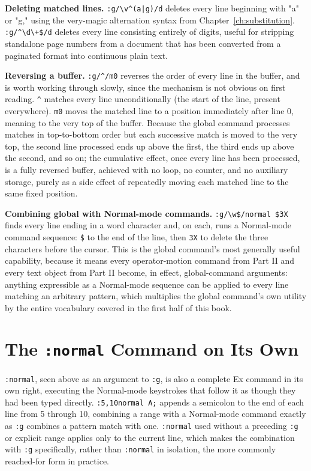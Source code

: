 \textbf{Deleting matched lines.} \texttt{:g/\textbackslash v\textasciicircum(a|g)/d} deletes every line beginning with "a" or "g," using the very-magic alternation syntax from Chapter~\ref{ch:substitution}. \texttt{:g/\textasciicircum\textbackslash d\textbackslash+\$/d} deletes every line consisting entirely of digits, useful for stripping standalone page numbers from a document that has been converted from a paginated format into continuous plain text.

\textbf{Reversing a buffer.} \texttt{:g/\textasciicircum/m0} reverses the order of every line in the buffer, and is worth working through slowly, since the mechanism is not obvious on first reading. \texttt{\textasciicircum} matches every line unconditionally (the start of the line, present everywhere). \texttt{m0} moves the matched line to a position immediately after line 0, meaning to the very top of the buffer. Because the global command processes matches in top-to-bottom order but each successive match is moved to the very top, the second line processed ends up above the first, the third ends up above the second, and so on; the cumulative effect, once every line has been processed, is a fully reversed buffer, achieved with no loop, no counter, and no auxiliary storage, purely as a side effect of repeatedly moving each matched line to the same fixed position.

\textbf{Combining global with Normal-mode commands.} \texttt{:g/\textbackslash w\$/normal \$3X} finds every line ending in a word character and, on each, runs a Normal-mode command sequence: \texttt{\$} to the end of the line, then \texttt{3X} to delete the three characters before the cursor. This is the global command's most generally useful capability, because it means every operator-motion command from Part II and every text object from Part II become, in effect, global-command arguments: anything expressible as a Normal-mode sequence can be applied to every line matching an arbitrary pattern, which multiplies the global command's own utility by the entire vocabulary covered in the first half of this book.

\section{The \texttt{:normal} Command on Its Own}

\texttt{:normal}, seen above as an argument to \texttt{:g}, is also a complete Ex command in its own right, executing the Normal-mode keystrokes that follow it as though they had been typed directly. \texttt{:5,10normal A;} appends a semicolon to the end of each line from 5 through 10, combining a range with a Normal-mode command exactly as \texttt{:g} combines a pattern match with one. \texttt{:normal} used without a preceding \texttt{:g} or explicit range applies only to the current line, which makes the combination with \texttt{:g} specifically, rather than \texttt{:normal} in isolation, the more commonly reached-for form in practice.

